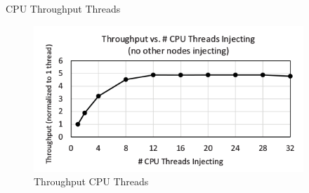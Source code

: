 \documentclass[t]{beamer}
\begin{document}
\begin{frame}{CPU Throughput Threads}
    \begin{figure}
        \includegraphics[width=4in]{img/throughput-cpu-thread.png}
        \caption{Throughput CPU Threads}
    \end{figure}
\end{frame}
\end{document}
